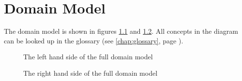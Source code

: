 \chapter{Domain Model}
\label{chap:domain-model}

\npar The domain model is shown in figures \ref{fig:domain-left} and
\ref{fig:domain-right}. All concepts in the diagram can be looked up in the glossary (see
\ref{chap:glossary}, page \pageref{chap:glossary}).

\begin{figure}[H]
	\begin{centering}
		\caption{The left hand side of the full domain model}
		\label{fig:domain-left}
	\end{centering}
\end{figure}

\begin{figure}[H]
	\begin{centering}
		\caption{The right hand side of the full domain model}
		\label{fig:domain-right}
	\end{centering}
\end{figure}